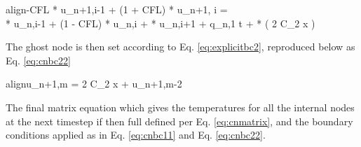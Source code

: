\documentclass[10pt, letter, showtrims]{extarticle}
\newcommand{\boxedeq}[2]{\begin{empheq}[box={\fboxsep=6pt\fbox}]{align}\label{#1}#2\end{empheq}}
\begin{document}
    		\boxedeq{eq:cnbc2}{-CFL * u_{n+1,i-1} + (1 + CFL) * u_{n+1, i} = \\ 
    			\frac{CFL}{2} * u_{n,i-1} + (1 - CFL) * u_{n,i} + \frac{CFL}{2} * u_{n,i+1} + q_{n,1} \Delta t + \frac{CFL}{2} * \big( 2 C_{2} \Delta x \big)}
    		
    		\noindent
    		The ghost node is then set according to Eq. \ref{eq:explicitbc2}, reproduced below as Eq. \ref{eq:cnbc22}
    		
    		\boxedeq{eq:cnbc22}{u_{n+1,m} = 2 C_{2} \Delta x + u_{n+1,m-2}}
    		
    		\noindent
    		The final matrix equation which gives the temperatures for all the internal nodes at the next timestep if then full defined per Eq. \ref{eq:cnmatrix}, and the boundary conditions applied as in Eq. \ref{eq:cnbc11} and Eq. \ref{eq:cnbc22}.
    		
\end{document}

